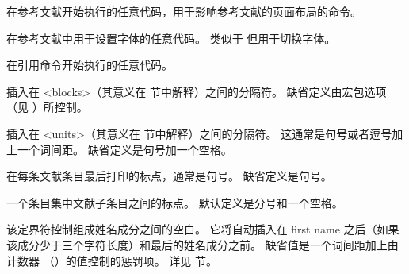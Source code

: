 \begin{ltxsyntax}

在参考文献开始执行的任意代码，用于影响参考文献的页面布局的命令。

在参考文献中用于设置字体的任意代码。
类似于  但用于切换字体。

在引用命令开始执行的任意代码。

插入在 <blocks>（其意义在  节中解释）之间的分隔符。
缺省定义由宏包选项 （见 ）所控制。

插入在 <units>（其意义在 节中解释）之间的分隔符。
这通常是句号或者逗号加上一个词间距。
缺省定义是句号加一个空格。

在每条文献条目最后打印的标点，通常是句号。
缺省定义是句号。

一个条目集中文献子条目之间的标点。
默认定义是分号和一个空格。

该定界符控制组成姓名成分之间的空白。
它将自动插入在 first name 之后（如果该成分少于三个字符长度）和最后的姓名成分之前。
缺省值是一个词间距加上由计数器 （）的值控制的惩罚项。
详见  节。


\end{ltxsyntax}
